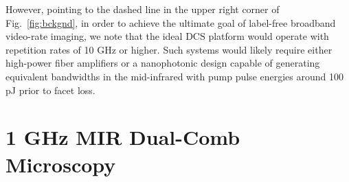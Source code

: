 \documentclass{optica-article}
\begin{document}


However, pointing to the dashed line in the upper right corner of \mbox{Fig. \ref{fig:bckgnd}}, in order to achieve the ultimate goal of label-free broadband video-rate imaging, we note that the ideal DCS platform would operate with repetition rates of 10 GHz or higher. Such systems would likely require either high-power fiber amplifiers or a nanophotonic design capable of generating equivalent bandwidths in the mid-infrared with pump pulse energies around 100 pJ prior to facet loss.





\section{1 GHz MIR Dual-Comb Microscopy}

\end{document}
